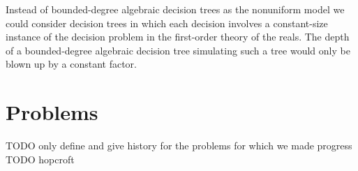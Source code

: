 
Instead of bounded-degree algebraic decision trees as the nonuniform model
we could consider decision trees in which
each decision involves a constant-size instance of the decision problem in the
first-order theory of the reals. The depth of a bounded-degree algebraic
decision tree simulating such a tree would only be blown up by a constant factor.


\part{Problems}

TODO only define and give history for the problems for which we made progress
TODO hopcroft







